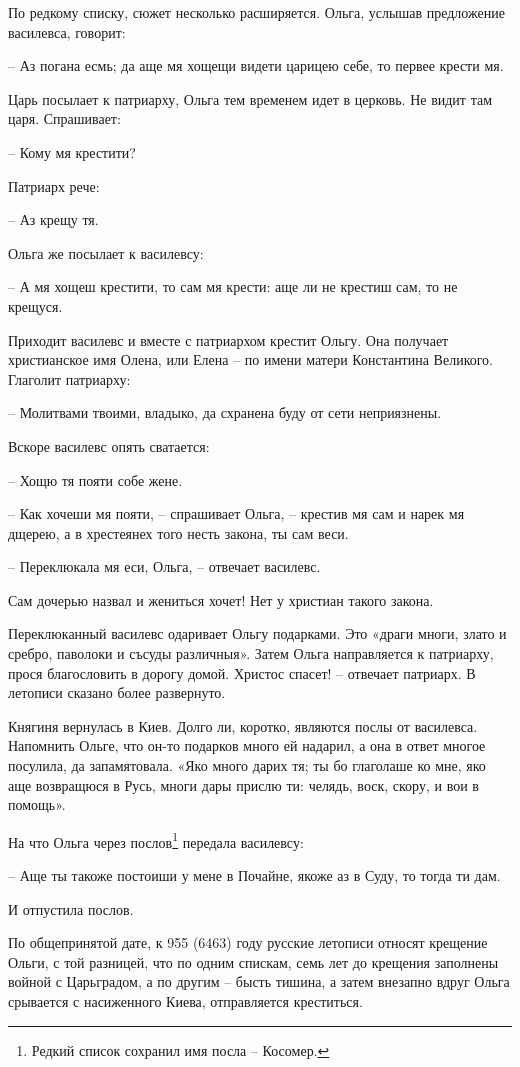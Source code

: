 По редкому списку, сюжет несколько расширяется. Ольга, услышав предложение василевса, говорит:

   – Аз погана есмь; да аще мя хощещи видети царицею себе, то первее крести мя.

Царь посылает к патриарху, Ольга тем временем идет в церковь. Не видит там царя. Спрашивает:

   – Кому мя крестити?

Патриарх рече:

   – Аз крещу тя.

Ольга же посылает к василевсу:

   – А мя хощеш крестити, то сам мя крести: аще ли не крестиш сам, то не крещуся.

Приходит василевс и вместе с патриархом крестит Ольгу. Она получает христианское имя Олена, или Елена – по имени матери Константина Великого. Глаголит патриарху:

   – Молитвами твоими, владыко, да схранена буду от сети неприязнены.

Вскоре василевс опять сватается:

   – Хощю тя пояти собе жене.

   – Как хочеши мя пояти, – спрашивает Ольга, – крестив мя сам и нарек мя дщерею, а в хрестеянех того несть закона, ты сам веси.

   – Переклюкала мя еси, Ольга, – отвечает василевс. 

Сам дочерью назвал и жениться хочет! Нет у христиан такого закона.

Переклюканный василевс одаривает Ольгу подарками. Это «драги многи, злато и сребро, паволоки и съсуды различныя». Затем Ольга направляется к патриарху, прося благословить в дорогу домой. Христос спасет! – отвечает патриарх. В летописи сказано более развернуто.

Княгиня вернулась в Киев. Долго ли, коротко, являются послы от василевса. Напомнить Ольге, что он-то подарков много ей надарил, а она в ответ многое посулила, да запамятовала. «Яко много дарих тя; ты бо глаголаше ко мне, яко аще возвращюся в Русь, многи дары прислю ти: челядь, воск, скору, и вои в помощь».

На что Ольга через послов\footnote{Редкий список сохранил имя посла – Косомер.} передала василевсу:

   – Аще ты такоже постоиши у мене в Почайне, якоже аз в Суду, то тогда ти дам.

И отпустила послов.

По общепринятой дате, к 955 (6463) году русские летописи относят крещение Ольги, с той разницей, что по одним спискам, семь лет до крещения заполнены войной с Царьградом, а по другим – бысть тишина, а затем внезапно вдруг Ольга срывается с насиженного Киева, отправляется креститься.

